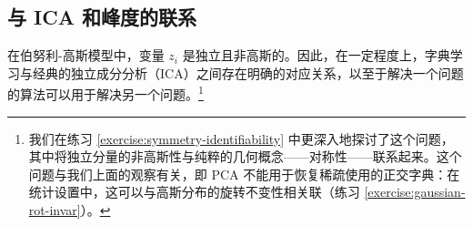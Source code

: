 \documentclass[../../book-main_zh.tex]{subfiles}
\begin{document}

%
%
%
%

\subsection{与 ICA 和峰度的联系}
在伯努利-高斯模型中，变量 $z_i$ 是独立且非高斯的。因此，在一定程度上，字典学习与经典的独立成分分析（ICA）之间存在明确的对应关系，以至于解决一个问题的算法可以用于解决另一个问题。\footnote{我们在练习 \ref{exercise:symmetry-identifiability} 中更深入地探讨了这个问题，其中将独立分量的非高斯性与纯粹的几何概念——对称性——联系起来。这个问题与我们上面的观察有关，即 PCA 不能用于恢复稀疏使用的正交字典：在统计设置中，这可以与高斯分布的旋转不变性相关联（练习 \ref{exercise:gaussian-rot-invar}）。}
\end{document}
